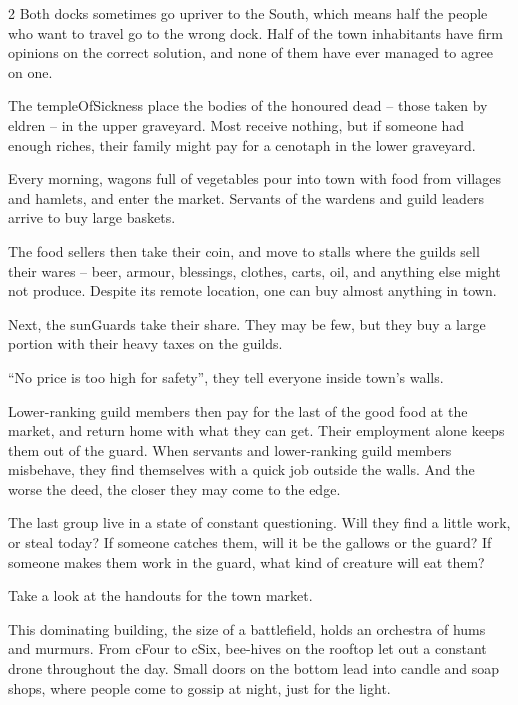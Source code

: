 \begin{multicols}{2}
Both docks sometimes go upriver to the South, which means half the people who want to travel go to the wrong dock.
Half of the \gls{town} inhabitants have firm opinions on the correct solution, and none of them have ever managed to agree on one.


The \gls{templeOfSickness} place the bodies of the honoured dead -- those taken by \gls{eldren} -- in the upper graveyard.
Most receive nothing, but if someone had enough riches, their family might pay for a cenotaph in the lower graveyard.


Every morning, wagons full of vegetables pour into \gls{town} with food from \glspl{village} and hamlets, and enter the market.
Servants of the \glspl{warden} and guild leaders arrive to buy large baskets.

The food sellers then take their coin, and move to stalls where the guilds sell their wares -- beer, armour, blessings, clothes, carts, oil, and anything else  might not produce.
Despite its remote location, one can buy almost anything in \gls{town}.

Next, the \glspl{sunGuard} take their share.
They may be few, but they buy a large portion with their heavy taxes on the guilds.

``No price is too high for safety'', they tell everyone inside \gls{town}'s walls.

Lower-ranking guild members then pay for the last of the good food at the market, and return home with what they can get.
Their employment alone keeps them out of the \gls{guard}.
When servants and lower-ranking guild members misbehave, they find themselves with a quick job outside the walls.
And the worse the deed, the closer they may come to the \gls{edge}.

The last group live in a state of constant questioning.
Will they find a little work, or steal today?
If someone catches them, will it be the gallows or the guard?
If someone makes them work in the \gls{guard}, what kind of creature will eat them?

Take a look at the handouts for the \gls{town} market.


This dominating building, the size of a battlefield, holds an orchestra of hums and murmurs.
From \gls{cFour} to \gls{cSix}, bee-hives on the rooftop let out a constant drone throughout the day.
Small doors on the bottom lead into candle and soap shops, where people come to gossip at night, just for the light.


\end{multicols}
